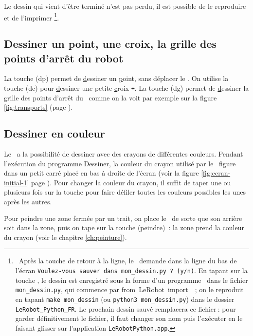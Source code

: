 Le dessin qui vient d'être terminé n'est pas perdu, il est
possible de le reproduire et de l'im\-pri\-mer%
\footnote{\ Après la touche de retour à la ligne, le \robot\ demande dans la ligne
du bas de l'écran {\tt Voulez-vous sauver dans mon\_dessin.py ? (y/n)}. En tapant
sur la touche , le dessin est enregistré sous la forme d'un programme \python\ dans 
le fichier {\tt mon\_dessin.py}, qui commence par {\mcl from}\ {\idt LeRobot}\ {\mcl import}\ {\idt *}~;
on le reproduit en tapant {\tt make mon\_dessin} (ou {\tt python3 mon\_dessin.py}) dans
le dossier {\tt LeRobot\_Python\_FR}. Le prochain dessin sauvé remplacera ce fichier$\:$: pour garder
définitivement le fichier, il faut changer son nom puis l'exécuter en le faisant glisser sur l'application
\texttt{LeRobotPython.app}.}.
 

\subsection{Dessiner un point, une croix, la grille des points d'arrêt du robot}

La touche  ({\idt dp}) permet de \underline{d}essiner un 
\underline{p}oint, sans déplacer le \robot. On utilise la
touche  ({\idt dc}) pour \underline{d}essiner une petite
\underline{c}roix {\tt +}. La touche  ({\idt dg})
permet de \underline{d}essiner la \underline{g}rille des points 
d'arrêt du \robot\ comme on la voit par exemple sur la figure
\ref{fig:transports} (page \pageref{fig:transports}).

\subsection{Dessiner en couleur}

Le \robot\ a la
possibilité de dessiner avec des crayons de différentes couleurs.
Pendant l'exé\-cu\-tion du programme {\idt Des\-si\-ner}, 
la couleur du crayon utilisé par le \robot\ figure dans un petit carré 
placé en bas à droite de l'écran (voir la figure \ref{fig:ecran-initial-1}
page \pageref{fig:ecran-initial-1}). Pour changer la couleur du crayon, 
il suffit de taper une ou plusieurs fois sur la touche \touche{*} pour faire
défiler toutes les couleurs possibles les unes
après les autres.

Pour peindre une zone fermée par un trait, on place le \robot\ de sorte
que son arrière soit dans la zone, puis on tape sur la touche 
({\idt peindre})~: la zone prend la couleur du crayon (voir le chapitre
\ref{ch:peinture}).

